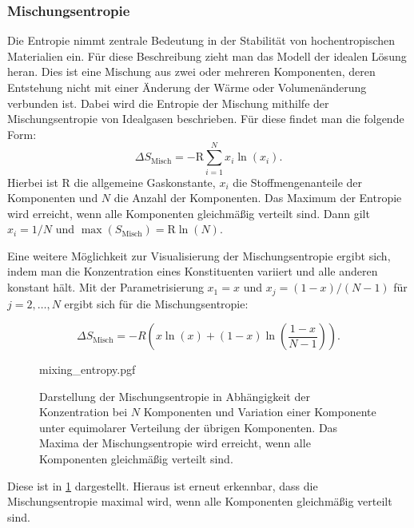 \subsubsection{Mischungsentropie}
Die Entropie nimmt zentrale Bedeutung in der Stabilität von hochentropischen Materialien ein.
Für diese Beschreibung zieht man das Modell der idealen Lösung heran.
Dies ist eine Mischung aus zwei oder mehreren Komponenten, deren Entstehung nicht mit einer Änderung der
Wärme oder Volumenänderung verbunden ist.
Dabei wird die Entropie der Mischung mithilfe der Mischungsentropie von Idealgasen beschrieben.
Für diese findet man die folgende Form:\autocite[7]{rost_phd}
\begin{equation}
    \Delta S_{\text{Misch}} = -\mathrm{R} \sum_{i=1}^N x_{i} \ln(x_{i}).
    \label{eq:Mischungsentropie}
\end{equation}
\autocite[7]{rost_phd}
Hierbei ist $\mathrm{R}$ die allgemeine Gaskonstante, $x_{i}$ die Stoffmengenanteile der Komponenten und $N$ die Anzahl
der Komponenten.
Das Maximum der Entropie wird erreicht, wenn alle Komponenten gleichmäßig verteilt sind.
Dann gilt $x_{i}=1/N$ und $\max(S_{\text{Misch}}) = \mathrm{R} \ln(N)$.

Eine weitere Möglichkeit zur Visualisierung der Mischungsentropie ergibt sich, indem man die Konzentration eines
Konstituenten variiert und alle anderen konstant hält.
Mit der Parametrisierung $x_{1} = x$ und $x_{j} = (1-x) / (N-1)$ für $j=2, \dots, N$ ergibt sich für die
Mischungsentropie:\autocite[3]{Rost2015}

\begin{equation}
    \Delta S_{\text{Misch}} = -R \left( x \ln(x) + (1-x) \ln \left( \frac{1-x}{N-1} \right) \right).
    \label{eq:Mischungsentropie2}
\end{equation}

\begin{figure}
    \centering
    {mixing_entropy.pgf}
    \caption{Darstellung der Mischungsentropie in Abhängigkeit der Konzentration bei $N$ Komponenten und Variation einer
    Komponente unter equimolarer Verteilung der übrigen Komponenten.
    Das Maxima der Mischungsentropie wird erreicht, wenn alle Komponenten gleichmäßig verteilt sind.
    }
    \label{fig:Mischungsentropie}
\end{figure}

Diese ist in \cref{fig:Mischungsentropie} dargestellt.
Hieraus ist erneut erkennbar, dass die Mischungsentropie maximal wird, wenn alle Komponenten gleichmäßig verteilt sind.

